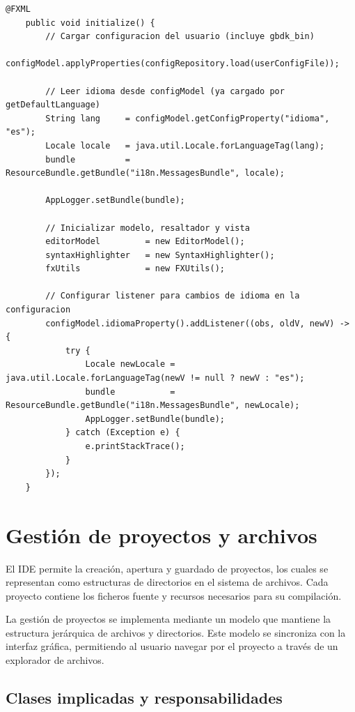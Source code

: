 \documentclass[../../main.tex]{subfiles}
\begin{document}
\begin{lstlisting}[style=mystyle, caption={Código de la clase MainController.java}, label={lst:codigo_clase_main_controller}]
    @FXML
    public void initialize() {
        // Cargar configuracion del usuario (incluye gbdk_bin)
        configModel.applyProperties(configRepository.load(userConfigFile));

        // Leer idioma desde configModel (ya cargado por getDefaultLanguage)
        String lang     = configModel.getConfigProperty("idioma", "es");
        Locale locale   = java.util.Locale.forLanguageTag(lang);
        bundle          = ResourceBundle.getBundle("i18n.MessagesBundle", locale);

        AppLogger.setBundle(bundle);

        // Inicializar modelo, resaltador y vista
        editorModel         = new EditorModel();
        syntaxHighlighter   = new SyntaxHighlighter();
        fxUtils             = new FXUtils();

        // Configurar listener para cambios de idioma en la configuracion
        configModel.idiomaProperty().addListener((obs, oldV, newV) -> {
            try {
                Locale newLocale = java.util.Locale.forLanguageTag(newV != null ? newV : "es");
                bundle           = ResourceBundle.getBundle("i18n.MessagesBundle", newLocale);
                AppLogger.setBundle(bundle);
            } catch (Exception e) {
                e.printStackTrace();
            }
        });
    }
\end{lstlisting}

\section{Gestión de proyectos y archivos}

El IDE permite la creación, apertura y guardado de proyectos, los cuales se representan como estructuras de directorios en el sistema de archivos. Cada proyecto contiene los ficheros fuente y recursos necesarios para su compilación.

La gestión de proyectos se implementa mediante un modelo que mantiene la estructura jerárquica de archivos y directorios. Este modelo se sincroniza con la interfaz gráfica, permitiendo al usuario navegar por el proyecto a través de un explorador de archivos.

\subsection{Clases implicadas y responsabilidades}
 
\end{document}

